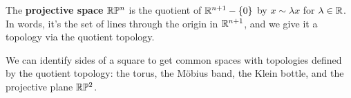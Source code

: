 \documentclass[twoside,10pt]{report}
\begin{document}
\begin{ex}[]
The \textbf{projective space} $\mathbb{R}\mathbb{P}^{n}$ is the quotient of $\mathbb{R}^{n+1}-\left\{ 0 \right\}$ by $x \sim \lambda x$ for $\lambda \in \mathbb{R}$. In words, it's the set of lines through the origin in $\mathbb{R}^{n+1}$, and we give it a topology via the quotient topology.
\end{ex}

\begin{ex}[]
We can identify sides of a square to get common spaces with topologies defined by the quotient topology: the torus, the M\"obius band, the Klein bottle, and the projective plane $\mathbb{R}\mathbb{P}^{2}$.
\end{ex}
\end{document}
